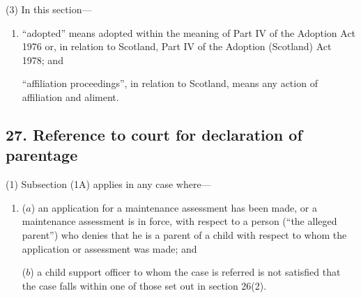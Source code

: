 \documentclass[12pt,a4paper]{article}
\begin{document}
(3) In this section—
\begin{enumerate}\item[]
    “adopted” means adopted within the meaning of Part IV of the Adoption Act 1976 or, in relation to Scotland, Part IV of the Adoption (Scotland) Act 1978; and

    “affiliation proceedings”, in relation to Scotland, means any action of affiliation and aliment. 
\end{enumerate}


\subsection{27. Reference to court for declaration of parentage}

%
%

(1) Subsection (1A) applies in any case where—
\begin{enumerate}\item[]
($a$) an application for a maintenance assessment has been made, or a maintenance assessment is in force, with respect to a person (“the alleged parent”) who denies that he is a parent of a child with respect to whom the application or assessment was made; and

($b$) 
a child support officer to whom the case is referred 
is not satisfied that the case falls within one of those set out in section 26(2).
\end{enumerate}
\end{document}
